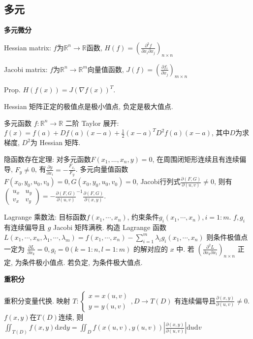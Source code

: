 \documentclass[UTF8]{ctexart}
\begin{document}
\subsection{多元}

\noindent \textbf{多元微分}

Hessian matrix: $f$为$\mathbb{R}^n\to\mathbb{R}$函数,
$H(f)=\left(\frac{\partial^2 f}{\partial x_i \partial x_j}\right)_{n\times n}$

Jacobi matrix: $f$为$\mathbb{R}^n\to \mathbb{R}^m$向量值函数,
$J(f)=\left(\frac{\partial f_i}{\partial x_j}\right)_{m\times n}$

Prop. $H(f(x))=J(\nabla f(x))^T$.

Hessian 矩阵正定的极值点是极小值点, 负定是极大值点.

多元函数 $f:\mathbb{R}^n\to\mathbb{R}$ 二阶 Taylor 展开:
$f(x) = f(a) + Df(a) (x-a) + \frac12 (x-a)^T D^2f(a) (x-a)$,
其中$D$为求梯度, $D^2$为 Hessian 矩阵.

隐函数存在定理:
对多元函数$F(x_1,\dots,x_n,y)=0$, 在周围闭矩形连续且有连续偏导, $F_y\neq 0$, 有$\frac{\partial y}{\partial x_i}=-\frac{F_{x_i}}{F_y}$.
多元向量值函数$F(x_0,y_0,u_0,v_0)=0, G(x_0,y_0,u_0,v_0)=0$, Jacobi行列式$\frac{\partial(F,G)}{\partial(u,v)}\neq 0$,
则有$\begin{pmatrix} u_x & u_y \\ v_x  & v_y \end{pmatrix} = -\frac{\partial(F,G)}{\partial(u,v)} ^{-1}\frac{\partial(F,G)}{\partial(x,y)}$.

Lagrange 乘数法: 目标函数$f(x_1,\cdots,x_n)$, 约束条件$g_i(x_1,\cdots,x_n),i=1:m$. $f,g_i$ 有连续偏导且 $g$ Jacobi 矩阵满秩.
构造 Lagrange 函数
$L(x_1,\cdots,x_n,\lambda_1,\cdots,\lambda_m)=f(x_1,\cdots,x_n)-\sum_{i=1}^m \lambda_i g_i(x_1,\cdots,x_n)$
则条件极值点一定为 $\frac{\partial L}{\partial x_k}=0, g_l=0 (k=1:n, l=1:m)$ 的解对应的 $x$ 中.
若 $(\frac{\partial ^2 L}{\partial x_k \partial x_l})_{n\times n}$ 正定, 为条件极小值点. 若负定, 为条件极大值点.

\noindent \textbf{重积分}

重积分变量代换. 映射
$T: \left\{\begin{matrix} x=x(u,v) \\y=y(u,v) \end{matrix}\right., D\to T(D)$
有连续偏导且$\frac{\partial(x,y)}{\partial(u,v)}\neq 0$.
$f(x,y)$在$T(D)$连续, 则
$\iint_{T(D)}f(x,y)\mathrm{d}x\mathrm{d}y=\iint_{D} f(x(u,v), y(u,v))
\left|\frac{\partial(x,y)}{\partial(u,v)}\right| \mathrm{d}u\mathrm{d}v$
\end{document}

